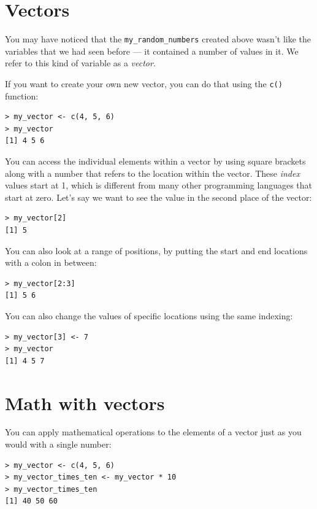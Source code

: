 \documentclass[
  12pt,
]{book}
\begin{document}
\hypertarget{vectors}{%
\section{Vectors}\label{vectors}}

You may have noticed that the \texttt{my\_random\_numbers} created above wasn't like the variables that we had seen before --- it contained a number of values in it. We refer to this kind of variable as a \emph{vector}.

If you want to create your own new vector, you can do that using the \texttt{c()} function:

\begin{verbatim}
> my_vector <- c(4, 5, 6)
> my_vector
[1] 4 5 6
\end{verbatim}

You can access the individual elements within a vector by using square brackets along with a number that refers to the location within the vector. These \emph{index} values start at 1, which is different from many other programming languages that start at zero.
Let's say we want to see the value in the second place of the vector:

\begin{verbatim}
> my_vector[2]
[1] 5
\end{verbatim}

You can also look at a range of positions, by putting the start and end locations with a colon in between:

\begin{verbatim}
> my_vector[2:3]
[1] 5 6
\end{verbatim}

You can also change the values of specific locations using the same indexing:

\begin{verbatim}
> my_vector[3] <- 7
> my_vector
[1] 4 5 7
\end{verbatim}

\hypertarget{math-with-vectors}{%
\section{Math with vectors}\label{math-with-vectors}}

You can apply mathematical operations to the elements of a vector just as you would with a single number:

\begin{verbatim}
> my_vector <- c(4, 5, 6)
> my_vector_times_ten <- my_vector * 10
> my_vector_times_ten
[1] 40 50 60
\end{verbatim}
\end{document}

